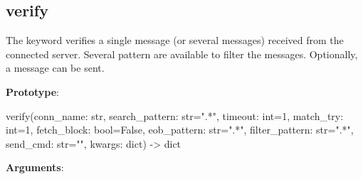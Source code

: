 \hypertarget{description-verify}{%
\subsection{\texorpdfstring{\textbf{verify}}{verify}}\label{description-verify}}

The keyword  verifies a single message (or several messages) received from the connected server.
Several pattern are available to filter the messages. Optionally, a message can be sent. 

\textbf{Prototype}:

\begin{robotcode}
verify(conn_name:      str,
       search_pattern: str=".*",
       timeout:        int=1,
       match_try:      int=1,
       fetch_block:    bool=False,
       eob_pattern:    str=".*",
       filter_pattern: str=".*",
       send_cmd:       str="",
       kwargs:         dict) -> dict
\end{robotcode}

\textbf{Arguments}:

